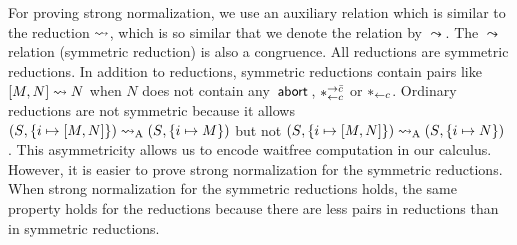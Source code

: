 For proving strong normalization, we use an auxiliary relation which is
similar to the reduction $\rightsquigarrow$, which is so similar that we denote
the relation by $\leadsto$.  The $\leadsto$ relation (symmetric
reduction) is also a
congruence.  All reductions are symmetric reductions.
In addition to reductions, symmetric reductions contain pairs like
$[{M, N}]\leadsto N$ when $N$ does not contain any~$\mathsf{abort\,}$,
$\ast^{\rightarrow {\bar{c}}}_{\leftarrow{c}}$ or $\ast_{\leftarrow{c}}$.
Ordinary reductions are not symmetric because it allows
$({S}{},{\{i\mapsto {[{M,N}]}\}})\rightsquigarrow_{\mathrm A} ({S}{},{\{i\mapsto {M}\}})$
but not
$({S}{},{\{i\mapsto {[{M,N}]}\}})\rightsquigarrow_{\mathrm A} ({S}{},{\{i\mapsto {N}\}})$%
.  This asymmetricity allows us to encode waitfree
computation in our calculus.  However, it is easier to prove strong
normalization for the symmetric reductions.  When strong normalization
for the symmetric reductions holds, the same property holds for the
reductions because there are less pairs in reductions than in symmetric
reductions.

